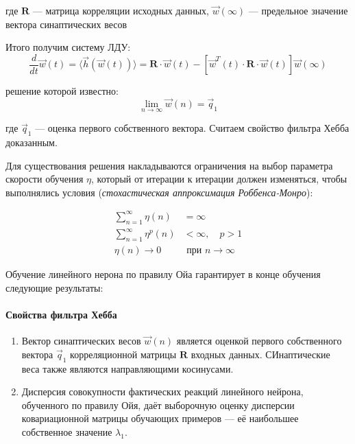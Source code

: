 \documentclass{article}
\numberwithin{equation}{subsection}
\begin{document}
\noindent
где $\mathbf{R}$ --- матрица корреляции исходных данных, $\vec{w}(\infty)$ --- предельное 
значение вектора синаптических весов

Итого получим систему ЛДУ: 
\begin{equation}
    \dfrac{d}{dt} \vec{w}(t) =  \langle \vec{h} (\vec{w}(t)) \rangle = 
    \mathbf{R}\cdot \vec{w}(t) - \left[ \vec{w}^T(t) \cdot \mathbf{R} \cdot \vec{w}(t) \right] \vec{w}(\infty)
\end{equation}

\noindent
решение которой известно:
\begin{equation}
    \lim_{n \to \infty} \vec{w}(n) = \vec{q}_1
\end{equation}

\noindent
где $\vec{q}_1$ --- оценка первого собственного вектора. Считаем свойство фильтра Хебба доказанным.

Для существования решения накладываются ограничения на выбор параметра скорости обучения $\eta$,
который от итерации к итерации должен изменяться, чтобы выполнялись условия
(\textit{стохастическая аппроксимация Роббенса-Монро}):

\begin{align}
    \sum_{n=1}^{\infty} \eta(n) &= \infty \\
    \sum_{n=1}^{\infty} \eta^p(n) &< \infty, \quad p>1 \\
    \eta(n) \to 0 &\text{ при } n \to \infty
\end{align}

Обучение линейного нерона по правилу Ойа гарантирует в конце обучения следующие результаты:

\paragraph{Свойства фильтра Хебба}
\begin{enumerate}
    \item Вектор синаптических весов $\vec{w}(n)$ является оценкой первого собственного вектора
        $\vec{q}_1$ корреляционной матрицы $\mathbf{R}$ входных данных.
        СИнаптические веса также являются направляющими косинусами.
    \item Дисперсия совокупности фактических реакций линейного нейрона, обученного по правилу Ойя, 
    даёт выборочную оценку дисперсии ковариационной матрицы обучающих примеров --- её наибольшее
    собственное значение $\lambda_1$.
\end{enumerate}
\end{document}
